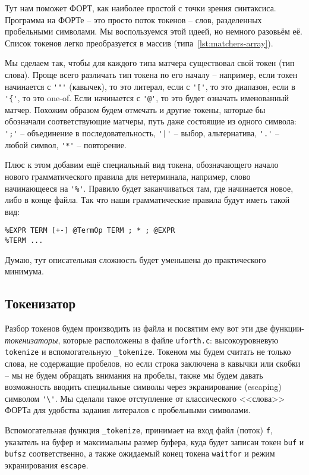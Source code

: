 \documentclass[10pt]{report}
\begin{document}
Тут нам поможет ФОРТ, как наиболее простой с точки зрения синтаксиса. Программа на ФОРТе -- это просто поток токенов -- слов, разделенных пробельными символами. Мы воспользуемся этой идеей, но немного разовьём её.
Список токенов легко преобразуется в массив (типа~\autoref{lst:matchers-array}).

Мы сделаем так, чтобы для каждого типа матчера существовал свой токен (тип слова).
Проще всего различать тип токена по его началу -- например, если токен начинается с \verb|'"'| (кавычек), то это литерал, если с \verb|'['|, то это диапазон, если в \verb+'{'+, то это  one-of. Если начинается с \verb|'@'|, то это будет означать именованный матчер.
 Похожим образом будем отмечать и другие токены, которые бы обозначали соответствующие матчеры, путь даже состоящие из одного символа: \verb|';'| -- объединение в последовательность, \verb+'|'+ -- выбор, альтернатива, \verb|'.'| -- любой символ, \verb|'*'|  -- повторение.

Плюс к этом добавим ещё специальный вид токена, обозначающего начало нового грамматического правила для нетерминала, например, слово начинающееся на \verb+'%'+. Правило будет заканчиваться там, где начинается новое, либо в конце файла.
Так что наши грамматические правила будут иметь такой вид:
\begin{verbatim}
%EXPR TERM [+-] @TermOp TERM ; * ; @EXPR
%TERM ...   
\end{verbatim}
Думаю, тут описательная сложность будет уменьшена до практического минимума.

\subsection{Токенизатор}
Разбор токенов будем производить из файла и посвятим ему вот эти две функции-\emph{токенизаторы}, которые расположены в файле \texttt{uforth.c}: высокоуровневую {\tt tokenize} и вспомогательную {\tt \_tokenize}.
 Токеном мы будем считать не только слова, не содержащие пробелов, но если строка заключена в кавычки или скобки -- мы не будем обращать внимания на пробелы, также мы будем давать возможность вводить специальные символы через экранирование (escaping) символом \verb|'\'|. 
 Мы сделали такое отступление от классического <<слова>> ФОРТа для удобства задания литералов с пробельными символами.

Вспомогательная функция {\tt \_tokenize}, принимает на вход файл (поток) {\tt f}, указатель на буфер и максимальны размер буфера, куда будет записан токен {\tt buf} и {\tt bufsz} соответственно, а также ожидаемый конец токена {\tt waitfor}  и режим экранирования {\tt escape}. 
\end{document}
